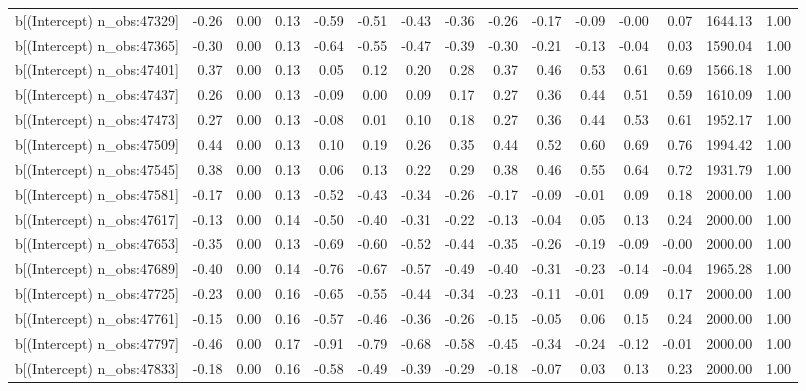 \begin{table}[ht]
\begin{tabular}{rrrrrrrrrrrrrrr}
  b[(Intercept) n\_obs:47329] & -0.26 & 0.00 & 0.13 & -0.59 & -0.51 & -0.43 & -0.36 & -0.26 & -0.17 & -0.09 & -0.00 & 0.07 & 1644.13 & 1.00 \\ 
  b[(Intercept) n\_obs:47365] & -0.30 & 0.00 & 0.13 & -0.64 & -0.55 & -0.47 & -0.39 & -0.30 & -0.21 & -0.13 & -0.04 & 0.03 & 1590.04 & 1.00 \\ 
  b[(Intercept) n\_obs:47401] & 0.37 & 0.00 & 0.13 & 0.05 & 0.12 & 0.20 & 0.28 & 0.37 & 0.46 & 0.53 & 0.61 & 0.69 & 1566.18 & 1.00 \\ 
  b[(Intercept) n\_obs:47437] & 0.26 & 0.00 & 0.13 & -0.09 & 0.00 & 0.09 & 0.17 & 0.27 & 0.36 & 0.44 & 0.51 & 0.59 & 1610.09 & 1.00 \\ 
  b[(Intercept) n\_obs:47473] & 0.27 & 0.00 & 0.13 & -0.08 & 0.01 & 0.10 & 0.18 & 0.27 & 0.36 & 0.44 & 0.53 & 0.61 & 1952.17 & 1.00 \\ 
  b[(Intercept) n\_obs:47509] & 0.44 & 0.00 & 0.13 & 0.10 & 0.19 & 0.26 & 0.35 & 0.44 & 0.52 & 0.60 & 0.69 & 0.76 & 1994.42 & 1.00 \\ 
  b[(Intercept) n\_obs:47545] & 0.38 & 0.00 & 0.13 & 0.06 & 0.13 & 0.22 & 0.29 & 0.38 & 0.46 & 0.55 & 0.64 & 0.72 & 1931.79 & 1.00 \\ 
  b[(Intercept) n\_obs:47581] & -0.17 & 0.00 & 0.13 & -0.52 & -0.43 & -0.34 & -0.26 & -0.17 & -0.09 & -0.01 & 0.09 & 0.18 & 2000.00 & 1.00 \\ 
  b[(Intercept) n\_obs:47617] & -0.13 & 0.00 & 0.14 & -0.50 & -0.40 & -0.31 & -0.22 & -0.13 & -0.04 & 0.05 & 0.13 & 0.24 & 2000.00 & 1.00 \\ 
  b[(Intercept) n\_obs:47653] & -0.35 & 0.00 & 0.13 & -0.69 & -0.60 & -0.52 & -0.44 & -0.35 & -0.26 & -0.19 & -0.09 & -0.00 & 2000.00 & 1.00 \\ 
  b[(Intercept) n\_obs:47689] & -0.40 & 0.00 & 0.14 & -0.76 & -0.67 & -0.57 & -0.49 & -0.40 & -0.31 & -0.23 & -0.14 & -0.04 & 1965.28 & 1.00 \\ 
  b[(Intercept) n\_obs:47725] & -0.23 & 0.00 & 0.16 & -0.65 & -0.55 & -0.44 & -0.34 & -0.23 & -0.11 & -0.01 & 0.09 & 0.17 & 2000.00 & 1.00 \\ 
  b[(Intercept) n\_obs:47761] & -0.15 & 0.00 & 0.16 & -0.57 & -0.46 & -0.36 & -0.26 & -0.15 & -0.05 & 0.06 & 0.15 & 0.24 & 2000.00 & 1.00 \\ 
  b[(Intercept) n\_obs:47797] & -0.46 & 0.00 & 0.17 & -0.91 & -0.79 & -0.68 & -0.58 & -0.45 & -0.34 & -0.24 & -0.12 & -0.01 & 2000.00 & 1.00 \\ 
  b[(Intercept) n\_obs:47833] & -0.18 & 0.00 & 0.16 & -0.58 & -0.49 & -0.39 & -0.29 & -0.18 & -0.07 & 0.03 & 0.13 & 0.23 & 2000.00 & 1.00 \\ 

\end{tabular}
\end{table}

